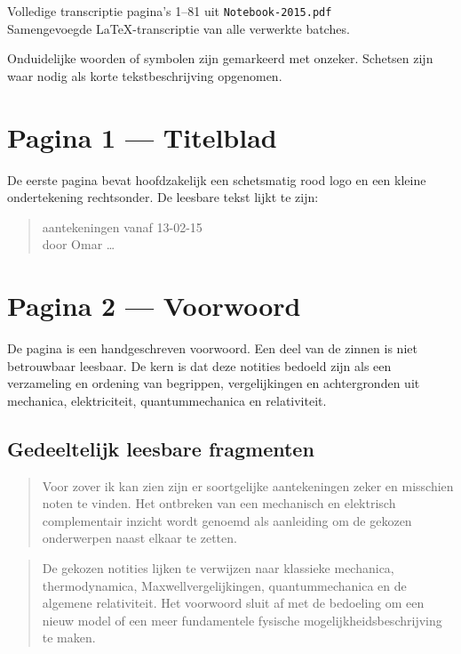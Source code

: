 \documentclass[11pt]{article}
\newcommand{\onzeker}[1]{\textcolor{red!70!black}{#1}}
\begin{document}
\begin{center}
{\Large Volledige transcriptie pagina's 1--81 uit \texttt{Notebook-2015.pdf}}\\[0.5em]
{\small Samengevoegde LaTeX-transcriptie van alle verwerkte batches.}
\end{center}

\noindent
Onduidelijke woorden of symbolen zijn gemarkeerd met \onzeker{onzeker}. Schetsen zijn waar nodig als korte tekstbeschrijving opgenomen.


\section*{Pagina 1 --- Titelblad}

De eerste pagina bevat hoofdzakelijk een schetsmatig rood logo en een kleine ondertekening rechtsonder. De leesbare tekst lijkt te zijn:
\begin{quote}
\onzeker{aantekeningen vanaf 13-02-15}\\
\onzeker{door Omar \ldots}
\end{quote}

\section*{Pagina 2 --- Voorwoord}

De pagina is een handgeschreven voorwoord. Een deel van de zinnen is niet betrouwbaar leesbaar. De kern is dat deze notities bedoeld zijn als een verzameling en ordening van begrippen, vergelijkingen en achtergronden uit mechanica, elektriciteit, quantummechanica en relativiteit.

\subsection*{Gedeeltelijk leesbare fragmenten}

\begin{quote}
Voor zover ik kan zien zijn er soortgelijke aantekeningen zeker en misschien noten te vinden.
Het ontbreken van een \onzeker{mechanisch} en \onzeker{elektrisch} complementair inzicht wordt genoemd als aanleiding om de gekozen onderwerpen naast elkaar te zetten.
\end{quote}

\begin{quote}
De gekozen notities lijken te verwijzen naar klassieke mechanica, thermodynamica, Maxwellvergelijkingen, quantummechanica en de algemene relativiteit. Het voorwoord sluit af met de bedoeling om een \onzeker{nieuw model} of een meer fundamentele fysische mogelijkheidsbeschrijving te maken.
\end{quote}
\end{document}
